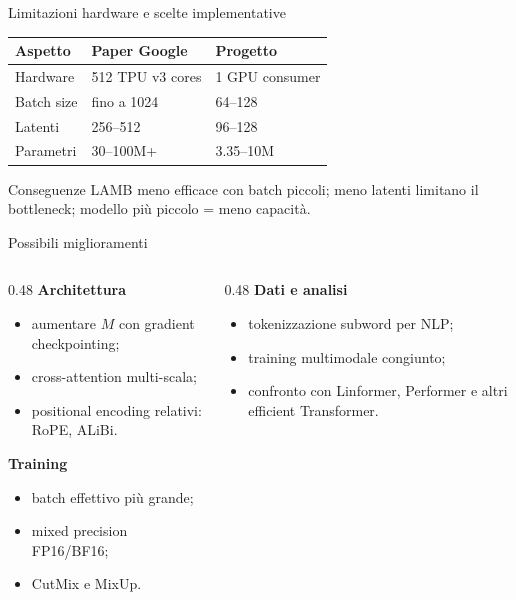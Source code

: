 \documentclass[aspectratio=169,10pt]{beamer}
\begin{document}
\begin{frame}{Limitazioni hardware e scelte implementative}
\small
\begin{center}
\begin{tabular}{lll}
\toprule
\textbf{Aspetto} & \textbf{Paper Google} & \textbf{Progetto} \\
\midrule
Hardware & 512 TPU v3 cores & 1 GPU consumer \\
Batch size & fino a 1024 & 64--128 \\
Latenti & 256--512 & 96--128 \\
Parametri & 30--100M+ & 3.35--10M \\
\bottomrule
\end{tabular}
\end{center}

\begin{alertblock}{Conseguenze}
LAMB meno efficace con batch piccoli; meno latenti limitano il bottleneck; modello più piccolo = meno capacità.
\end{alertblock}
\end{frame}

\begin{frame}{Possibili miglioramenti}
\small
\begin{columns}[T]
\begin{column}{0.48\textwidth}
\textbf{Architettura}
\begin{itemize}
  \item aumentare $M$ con gradient checkpointing;
  \item cross-attention multi-scala;
  \item positional encoding relativi: RoPE, ALiBi.
\end{itemize}

\textbf{Training}
\begin{itemize}
  \item batch effettivo più grande;
  \item mixed precision FP16/BF16;
  \item CutMix e MixUp.
\end{itemize}
\end{column}
\begin{column}{0.48\textwidth}
\textbf{Dati e analisi}
\begin{itemize}
  \item tokenizzazione subword per NLP;
  \item training multimodale congiunto;
  \item confronto con Linformer, Performer e altri efficient Transformer.
\end{itemize}
\end{column}
\end{columns}
\end{frame}
\end{document}

